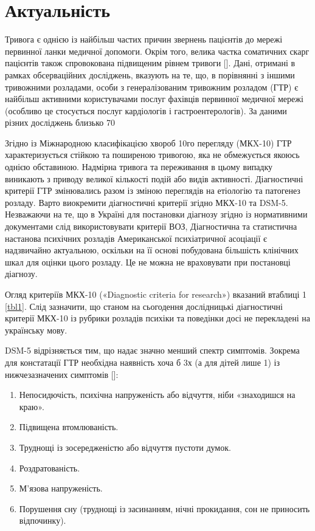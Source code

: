\documentclass[twocolumn]{article}
\date{}
\begin{document}
\section {Актуальність}
\par Тривога є однією із найбільш частих причин звернень пацієнтів до мережі первинної ланки медичної допомоги. Окрім того, велика частка соматичних скарг пацієнтів також спровокована підвищеним рівнем тривоги [\cite{bib1}]. Дані, отримані в рамках обсерваційних досліджень, вказують на те, що, в порівнянні з іншими тривожними розладами, особи з генералізованим тривожним розладом (ГТР) є найбільш активними користувачами послуг фахівців первинної медичної мережі (особливо це стосується послуг кардіологів і гастроентерологів). За даними різних досліджень близько 70%
\par Згідно із Міжнародною класифікацією хвороб 10го перегляду (МКX-10) ГТР характеризується стійкою та поширеною тривогою, яка не обмежується якоюсь однією обставиною. Надмірна тривога та переживання в цьому випадку виникають з приводу великої кількості подій або видів активності. Діагностичні критерії ГТР змінювались разом із зміною переглядів на етіологію та патогенез розладу. Варто виокремити діагностичні критерії згідно МКХ-10 та DSM-5. Незважаючи на те, що в Україні для постановки діагнозу згідно із нормативними документами слід використовувати критерії ВОЗ, Діагностична та статистична настанова психічних розладів Американської психіатричної асоціації є надзвичайно актуальною, оскільки на її основі побудована більшість клінічних шкал для оцінки цього розладу. Це не можна не враховувати при постановці діагнозу.
\par Огляд критеріїв МКХ-10 («Diagnostic criteria for research») вказаний втаблиці 1 \ref{tbl1}. Слід зазначити, що станом на сьогодення дослідницькі діагностичні критерії МКХ-10 із рубрики розладів психіки та поведінки досі не перекладені на українську мову.
\par DSM-5 відрізняється тим, що надає значно менший спектр симптомів. Зокрема для констатації ГТР необхідна наявність хоча б 3х (а для дітей лише 1) із нижчезазначених симптомів [\cite{bib6}]:
\begin{enumerate}
\item Непосидючість, психічна напруженість або відчуття, ніби «знаходишся на краю».
\item Підвищена втомлюваність.
\item Труднощі із зосередженістю або відчуття пустоти думок.
\item Роздратованість.
\item М’язова напруженість.
\item Порушення сну (труднощі із засинанням, нічні прокидання, сон не приносить відпочинку).
\end{enumerate}
\end{document}
